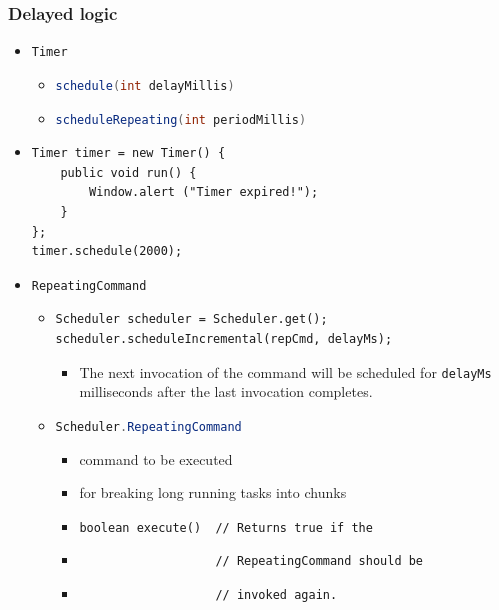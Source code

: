 \documentclass[10pt,table, xcolor=pdflatex]{beamer}
\newcommand{\inlinejava}{\lstinline[language={Java}]}
\begin{document}
\begin{frame}[fragile]\frametitle{Delayed logic}
	\begin{itemize}
		\item \texttt{Timer}
          \begin{itemize}
        	\item \inlinejava{schedule(int delayMillis)}
            \item \inlinejava{scheduleRepeating(int periodMillis)}
          \end{itemize}
        \item[]
            \lstset{language=Java, basicstyle=\footnotesize\ttfamily}
            \begin{lstlisting}
Timer timer = new Timer() {
    public void run() {
        Window.alert ("Timer expired!");
    }
};
timer.schedule(2000);
            \end{lstlisting}
		\item \texttt{RepeatingCommand}
        \begin{itemize}
       		\item
            	\lstset{language=Java, basicstyle=\footnotesize\ttfamily}
                \begin{lstlisting}
Scheduler scheduler = Scheduler.get();
scheduler.scheduleIncremental(repCmd, delayMs);
                \end{lstlisting}
                \vspace{-.5em}
                \begin{itemize}
                    \item The next invocation of the command will be scheduled for \texttt{delayMs} milliseconds after the last invocation completes.
                \end{itemize}
            \item \inlinejava{Scheduler.RepeatingCommand}
              \begin{itemize}
                \item command to be executed
            	\item for breaking long running tasks into chunks
				\item \verb+boolean execute()  // Returns true if the+
                \item[] \verb+                   // RepeatingCommand should be +
                \item[] \verb+                   // invoked again.+
              \end{itemize}   
		\end{itemize}   
	\end{itemize}
\end{frame}
\end{document}
